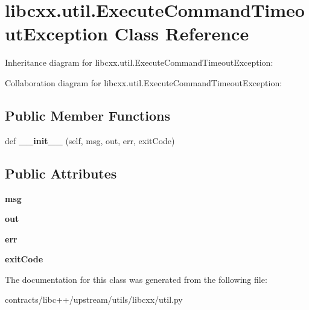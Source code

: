 \hypertarget{classlibcxx_1_1util_1_1_execute_command_timeout_exception}{}\section{libcxx.\+util.\+Execute\+Command\+Timeout\+Exception Class Reference}
\label{classlibcxx_1_1util_1_1_execute_command_timeout_exception}


Inheritance diagram for libcxx.\+util.\+Execute\+Command\+Timeout\+Exception\+:


Collaboration diagram for libcxx.\+util.\+Execute\+Command\+Timeout\+Exception\+:
\subsection*{Public Member Functions}
\begin{DoxyCompactItemize}
\item 
\mbox{\label{classlibcxx_1_1util_1_1_execute_command_timeout_exception_afc79df9b7e5b9758c1a1a63c2800b6b2}} 
def {\bfseries \+\_\+\+\_\+init\+\_\+\+\_\+} (self, msg, out, err, exit\+Code)
\end{DoxyCompactItemize}
\subsection*{Public Attributes}
\begin{DoxyCompactItemize}
\item 
\mbox{\label{classlibcxx_1_1util_1_1_execute_command_timeout_exception_ab6cb09e381c0350d0bbf20311a2f45f3}} 
{\bfseries msg}
\item 
\mbox{\label{classlibcxx_1_1util_1_1_execute_command_timeout_exception_a4f32aeb82d5244bc1f391c88e19d9048}} 
{\bfseries out}
\item 
\mbox{\label{classlibcxx_1_1util_1_1_execute_command_timeout_exception_a325320bfc077a58613f6d7c41c3af982}} 
{\bfseries err}
\item 
\mbox{\label{classlibcxx_1_1util_1_1_execute_command_timeout_exception_ac78a935bb353ba460b5fd9fd41698992}} 
{\bfseries exit\+Code}
\end{DoxyCompactItemize}


The documentation for this class was generated from the following file\+:\begin{DoxyCompactItemize}
\item 
contracts/libc++/upstream/utils/libcxx/util.\+py\end{DoxyCompactItemize}
